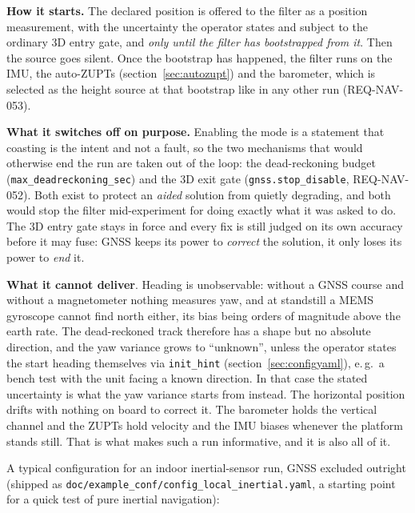 \documentclass[11pt,a4paper]{article}
\newcommand{\code}[1]{\texttt{#1}}
\begin{document}
\medskip
\noindent\textbf{How it starts.} The declared position is offered to the filter
as a position measurement, with the uncertainty the operator states and
subject to the ordinary 3D entry gate, and \emph{only until the filter has
bootstrapped from it}. Then the source goes silent. Once the
bootstrap has happened, the filter runs on the IMU, the auto-ZUPTs
(section~\ref{sec:autozupt}) and the barometer, which is selected as the height
source at that bootstrap like in any other run (REQ-NAV-053).

\medskip
\noindent\textbf{What it switches off on purpose.} Enabling the mode is a
statement that coasting is the intent and not a fault, so the two mechanisms that
would otherwise end the run are taken out of the loop: the dead-reckoning
budget (\code{max\_\allowbreak{}deadreckoning\_\allowbreak{}sec}) and the 3D exit gate
(\code{gnss.stop\_\allowbreak{}disable}, REQ-NAV-052). Both exist to protect an
\emph{aided} solution from quietly degrading, and both would stop the filter
mid-experiment for doing exactly what it was asked to do. The 3D entry gate
stays in force and every fix is still judged on its own accuracy before it may
fuse: GNSS keeps its power to \emph{correct} the solution, it only loses its
power to \emph{end} it.

\medskip
\noindent\textbf{What it cannot deliver}. Heading is unobservable: without a
GNSS course and without a magnetometer nothing measures yaw, and at standstill
a MEMS gyroscope cannot find north either, its bias being orders of magnitude
above the earth rate. The dead-reckoned track therefore has a shape but no
absolute direction, and the yaw variance grows to ``unknown'', unless the
operator states the start heading themselves via \code{init\_\allowbreak{}hint}
(section~\ref{sec:configyaml}), e.\,g.\ a bench test with the unit facing a known
direction. In that case the stated uncertainty is what the yaw variance
starts from instead.
The horizontal position drifts with nothing on board to correct it. The barometer
holds the vertical channel and the ZUPTs hold velocity and the IMU biases
whenever the platform stands still. That is what makes such a run
informative, and it is also all of it.

\medskip
\noindent A typical configuration for an indoor inertial-sensor run, GNSS
excluded outright (shipped as
\code{doc/example\_\allowbreak{}conf/config\_\allowbreak{}local\_\allowbreak{}inertial.yaml},
a starting point for a quick test of pure inertial navigation):
\end{document}

